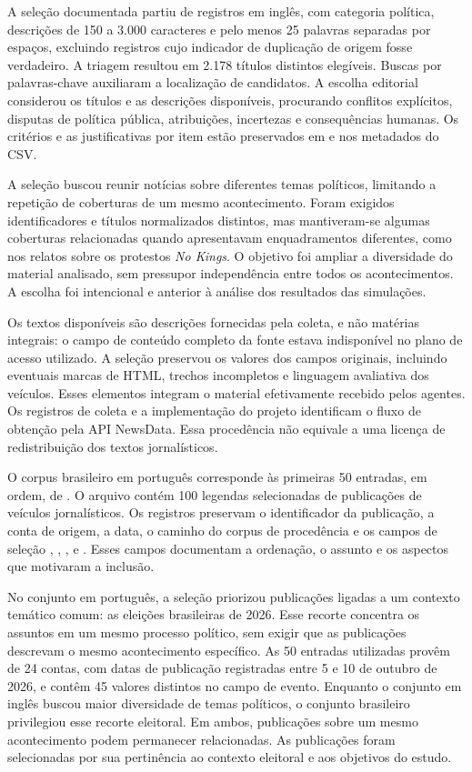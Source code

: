 A seleção documentada partiu de registros em inglês, com categoria política, descrições de 150 a 3.000 caracteres e pelo menos 25 palavras separadas por espaços, excluindo registros cujo indicador de duplicação de origem fosse verdadeiro. A triagem resultou em 2.178 títulos distintos elegíveis. Buscas por palavras-chave auxiliaram a localização de candidatos. A escolha editorial considerou os títulos e as descrições disponíveis, procurando conflitos explícitos, disputas de política pública, atribuições, incertezas e consequências humanas. Os critérios e as justificativas por item estão preservados em  e nos metadados do CSV.

A seleção buscou reunir notícias sobre diferentes temas políticos, limitando a repetição de coberturas de um mesmo acontecimento. Foram exigidos identificadores e títulos normalizados distintos, mas mantiveram-se algumas coberturas relacionadas quando apresentavam enquadramentos diferentes, como nos relatos sobre os protestos \textit{No Kings}. O objetivo foi ampliar a diversidade do material analisado, sem pressupor independência entre todos os acontecimentos. A escolha foi intencional e anterior à análise dos resultados das simulações.

Os textos disponíveis são descrições fornecidas pela coleta, e não matérias integrais: o campo de conteúdo completo da fonte estava indisponível no plano de acesso utilizado. A seleção preservou os valores dos campos originais, incluindo eventuais marcas de HTML, trechos incompletos e linguagem avaliativa dos veículos. Esses elementos integram o material efetivamente recebido pelos agentes. Os registros de coleta e a implementação do projeto identificam o fluxo de obtenção pela API NewsData. Essa procedência não equivale a uma licença de redistribuição dos textos jornalísticos.

O corpus brasileiro em português corresponde às primeiras 50 entradas, em ordem, de . O arquivo contém 100 legendas selecionadas de publicações de veículos jornalísticos. Os registros preservam o identificador da publicação, a conta de origem, a data, o caminho do corpus de procedência e os campos de seleção , , ,  e . Esses campos documentam a ordenação, o assunto e os aspectos que motivaram a inclusão.

No conjunto em português, a seleção priorizou publicações ligadas a um contexto temático comum: as eleições brasileiras de 2026. Esse recorte concentra os assuntos em um mesmo processo político, sem exigir que as publicações descrevam o mesmo acontecimento específico. As 50 entradas utilizadas provêm de 24 contas, com datas de publicação registradas entre 5 e 10 de outubro de 2026, e contêm 45 valores distintos no campo de evento. Enquanto o conjunto em inglês buscou maior diversidade de temas políticos, o conjunto brasileiro privilegiou esse recorte eleitoral. Em ambos, publicações sobre um mesmo acontecimento podem permanecer relacionadas. As publicações foram selecionadas por sua pertinência ao contexto eleitoral e aos objetivos do estudo.

